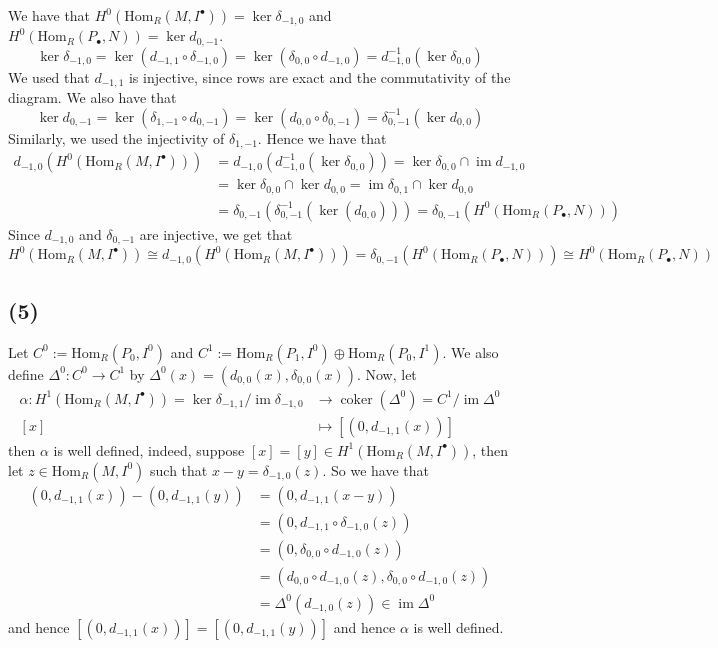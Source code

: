 \documentclass{article}
\newcommand{\Hom}[2]{\mathrm{Hom}_R(#1, #2)}
\DeclareMathOperator{\im}{im}
\DeclareMathOperator{\coker}{coker}
\begin{document}
We have that $H^0(\Hom{M}{I^\bullet}) = \ker \delta_{-1, 0}$
and $H^0(\Hom{P_\bullet}{N}) = \ker d_{0, -1}$.
\begin{equation*}
	\ker \delta_{-1, 0} = \ker(d_{-1, 1}\circ \delta_{-1, 0})
	= \ker(\delta_{0, 0} \circ d_{-1, 0})
	= d_{-1, 0}^{-1}(\ker \delta_{0, 0})
\end{equation*}
We used that $d_{-1, 1}$ is injective, since rows are exact and
the commutativity of the diagram. We also have that
\begin{equation*}
	\ker d_{0, -1} = \ker(\delta_{1, -1}\circ d_{0, -1})
	= \ker(d_{0, 0} \circ \delta_{0, -1})
	= \delta_{0, -1}^{-1}(\ker d_{0, 0})
\end{equation*}
Similarly, we used the injectivity of $\delta_{1, -1}$.
Hence we have that
\begin{align*}
	d_{-1, 0}(H^0(\Hom{M}{I^\bullet}))
	&= d_{-1, 0}(d_{-1, 0}^{-1}(\ker \delta_{0, 0}))
	= \ker \delta_{0, 0} \cap \im d_{-1, 0}\\
	&= \ker{\delta_{0, 0}} \cap \ker d_{0, 0}
	= \im \delta_{0, 1} \cap \ker d_{0, 0}\\
	&= \delta_{0, -1}(\delta_{0, -1}^{-1}(\ker(d_{0, 0})))
	= \delta_{0, -1}(H^0(\Hom{P_\bullet}{N}))
\end{align*}
Since $d_{-1, 0}$ and $\delta_{0, -1}$ are injective, we get that
\begin{equation*}
	H^0(\Hom{M}{I^\bullet}) \cong
	d_{-1, 0}(H^0(\Hom{M}{I^\bullet}))
	= \delta_{0, -1}(H^0(\Hom{P_\bullet}{N}))
	\cong H^0(\Hom{P_\bullet}{N})
\end{equation*}

\subsection*{(5)}

Let $C^0 := \Hom{P_0}{I^0}$ and
$C^1 := \Hom{P_1}{I^0} \oplus \Hom{P_0}{I^1}$. We also define
$\Delta^0: C^0 \to C^1$ by 
$\Delta^0(x) = (d_{0, 0}(x), \delta_{0, 0}(x))$.
Now, let
\begin{align*}
	\alpha: H^1(\Hom{M}{I^\bullet}) =
	\ker \delta_{-1, 1}/\im \delta_{-1, 0} &\to \coker(\Delta^0)
	= C^1/\im \Delta^0\\
	[x] &\mapsto [(0, d_{-1, 1}(x))]
\end{align*}
then $\alpha$ is well defined, indeed, suppose 
$[x] = [y] \in H^1(\Hom{M}{I^\bullet})$, then
let $z \in \Hom{M}{I^0}$ such that $x - y = \delta_{-1, 0}(z)$.
So we have that
\begin{align*}
	(0, d_{-1, 1}(x)) - (0, d_{-1, 1}(y)) &= 
	(0, d_{-1, 1}(x - y))\\
	&= (0, d_{-1, 1}\circ\delta_{-1, 0}(z))\\
	&= (0, \delta_{0, 0}\circ d_{-1, 0}(z))\\
	&= (d_{0, 0}\circ d_{-1, 0}(z),
	\delta_{0, 0}\circ d_{-1, 0}(z))\\
	&= \Delta^0(d_{-1, 0}(z)) \in \im \Delta^0
\end{align*}
and hence $[(0, d_{-1, 1}(x))] = [(0, d_{-1, 1}(y))]$ and hence
$\alpha$ is well defined.
\end{document}
